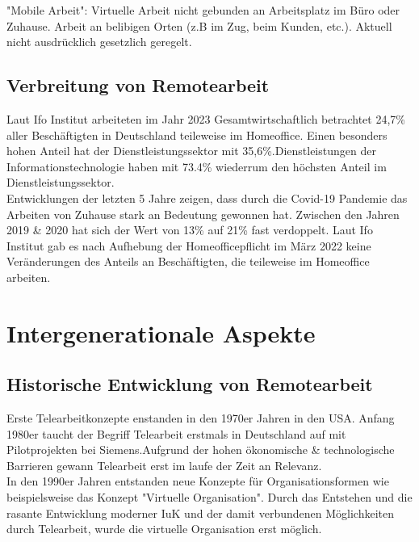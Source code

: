 \documentclass[runningheads]{llncs}
\begin{document}
"Mobile Arbeit": Virtuelle Arbeit nicht gebunden an Arbeitsplatz im Büro oder Zuhause\cite{bundestag}. Arbeit an belibigen Orten (z.B im Zug, beim Kunden, etc.). Aktuell nicht ausdrücklich gesetzlich geregelt\cite{bundestag}.

\subsection{Verbreitung von Remotearbeit}
Laut Ifo Institut arbeiteten im Jahr 2023 Gesamtwirtschaftlich betrachtet 24,7\% aller Beschäftigten in Deutschland teileweise im Homeoffice\cite{ifo23}. Einen besonders hohen Anteil hat der Dienstleistungssektor mit 35,6\%\cite{ifo23}.Dienstleistungen der Informationstechnologie haben mit 73.4\% wiederrum den höchsten Anteil im Dienstleistungssektor\cite{ifo23}.\\
Entwicklungen der letzten 5 Jahre zeigen, dass durch die Covid-19 Pandemie das Arbeiten von Zuhause stark an Bedeutung gewonnen hat. Zwischen den Jahren 2019 \& 2020 hat sich der Wert von 13\% auf 21\% fast verdoppelt\cite{statis23}. Laut Ifo Institut gab es nach Aufhebung der Homeofficepflicht im März 2022 keine Veränderungen des Anteils an Beschäftigten, die teileweise im Homeoffice arbeiten\cite{ifo23}.

\section{Intergenerationale Aspekte}

\subsection{Historische Entwicklung von Remotearbeit}
Erste Telearbeitkonzepte enstanden in den 1970er Jahren in den USA\cite{Dangelmaier.1999}. Anfang 1980er taucht der Begriff Telearbeit erstmals in Deutschland auf mit Pilotprojekten bei Siemens\cite{Dangelmaier.1999}.Aufgrund der hohen ökonomische \& technologische Barrieren gewann Telearbeit erst im laufe der Zeit an Relevanz\cite{Dangelmaier.1999}.\\
In den 1990er Jahren entstanden neue Konzepte für Organisationsformen wie beispielsweise das Konzept "Virtuelle Organisation"\cite{Siedenbiedel.2020}. Durch das Entstehen und die rasante Entwicklung moderner IuK und der damit verbundenen Möglichkeiten durch Telearbeit, wurde die virtuelle Organisation erst möglich\cite{Siedenbiedel.2020}.
\end{document}
